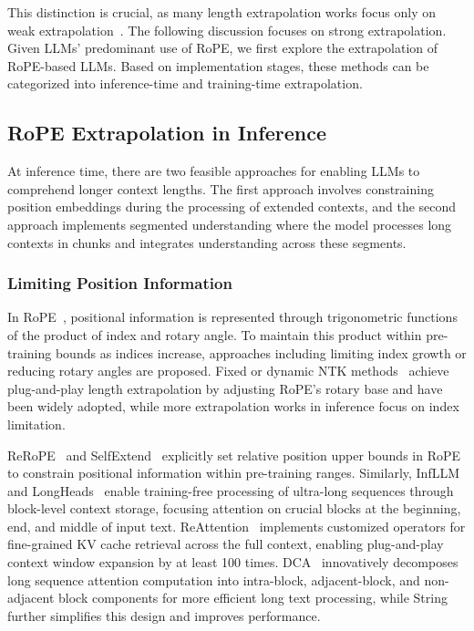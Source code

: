 This distinction is crucial, as many length extrapolation works focus only on weak extrapolation~\citep{han2024lm,xiaoefficient,ding2023longnet}. The following discussion focuses on strong extrapolation. Given LLMs' predominant use of RoPE, we first explore the extrapolation of RoPE-based LLMs. Based on implementation stages, these methods can be categorized into inference-time and training-time extrapolation.

\subsection{RoPE Extrapolation in Inference}\label{sec2_2}
At inference time, there are two feasible approaches for enabling LLMs to comprehend longer context lengths. The first approach involves constraining position embeddings during the processing of extended contexts, and the second approach implements segmented understanding where the model processes long contexts in chunks and integrates understanding across these segments.

\subsubsection{Limiting Position Information} 
In RoPE~\citep{su2024roformer}, positional information is represented through trigonometric functions of the product of index and rotary angle. To maintain this product within pre-training bounds as indices increase, approaches including limiting index growth or reducing rotary angles are proposed. Fixed or dynamic NTK methods~\citep{fixedNTK,dynamicNTK} achieve plug-and-play length extrapolation by adjusting RoPE's rotary base and have been widely adopted, while more extrapolation works in inference focus on index limitation.

ReRoPE~\citep{rerope} and SelfExtend~\citep{jin2024llm} explicitly set relative position upper bounds in RoPE to constrain positional information within pre-training ranges. Similarly, InfLLM~\citep{xiao2024infllm} and LongHeads~\citep{lu2024longheads} enable training-free processing of ultra-long sequences through block-level context storage, focusing attention on crucial blocks at the beginning, end, and middle of input text. ReAttention~\citep{liu2024reattention} implements customized operators for fine-grained KV cache retrieval across the full context, enabling plug-and-play context window expansion by at least 100 times. DCA~\citep{an2024training} innovatively decomposes long sequence attention computation into intra-block, adjacent-block, and non-adjacent block components for more efficient long text processing, while String~\citep{an2024does} further simplifies this design and improves performance.

